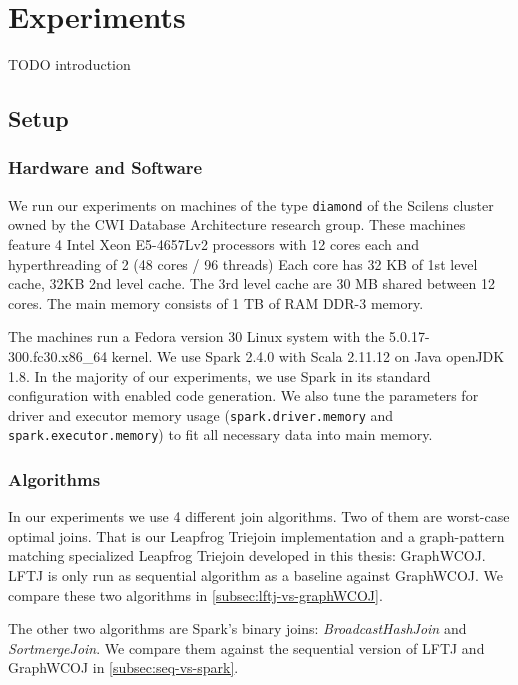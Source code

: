 \section{Experiments}\label{sec:experiments}

TODO introduction

\subsection{Setup}

\subsubsection{Hardware and Software}

We run our experiments on machines of the type \texttt{diamond} of the Scilens cluster owned by the CWI Database Architecture research
group.
These machines feature 4 Intel Xeon E5-4657Lv2 processors with 12 cores each and hyperthreading of 2 (48 cores / 96 threads)
Each core has 32 KB of 1st level cache, 32KB 2nd level cache.
The 3rd level cache are 30 MB shared between 12 cores.
The main memory consists of 1 TB of RAM DDR-3 memory.

The machines run a Fedora version 30 Linux system with the 5.0.17-300.fc30.x86\_64 kernel.
We use Spark 2.4.0 with Scala 2.11.12 on Java openJDK 1.8.
In the majority of our experiments, we use Spark in its standard configuration with enabled code generation.
We also tune the parameters for driver and executor memory usage (\texttt{spark.driver.memory} and \texttt{spark.executor.memory}) to fit
all necessary data into main memory.

\subsubsection{Algorithms}

In our experiments we use 4 different join algorithms.
Two of them are worst-case optimal joins.
That is our Leapfrog Triejoin implementation and a graph-pattern matching
specialized Leapfrog Triejoin developed in this thesis: Graph\textsc{WCOJ}.
LFTJ is only run as sequential algorithm as a baseline against GraphWCOJ.
We compare these two algorithms in \cref{subsec:lftj-vs-graphWCOJ}.

The other two algorithms are Spark's binary joins: \textit{BroadcastHashJoin} and \textit{SortmergeJoin}.
We compare them against the sequential version of \textsc{LFTJ} and GraphWCOJ in \cref{subsec:seq-vs-spark}.

